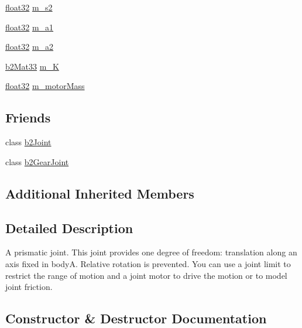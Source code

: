 \begin{DoxyCompactItemize}
\item 
\mbox{\hyperlink{b2_settings_8h_aacdc525d6f7bddb3ae95d5c311bd06a1}{float32}} \mbox{\hyperlink{classb2_prismatic_joint_a7b82750572655292a3e08490d1131f31}{m\+\_\+s2}}
\item 
\mbox{\hyperlink{b2_settings_8h_aacdc525d6f7bddb3ae95d5c311bd06a1}{float32}} \mbox{\hyperlink{classb2_prismatic_joint_afa9f7a7b4317a491d76390e0db7034e4}{m\+\_\+a1}}
\item 
\mbox{\hyperlink{b2_settings_8h_aacdc525d6f7bddb3ae95d5c311bd06a1}{float32}} \mbox{\hyperlink{classb2_prismatic_joint_a91fd8e15cd9c610c343d162cb31e6552}{m\+\_\+a2}}
\item 
\mbox{\hyperlink{structb2_mat33}{b2\+Mat33}} \mbox{\hyperlink{classb2_prismatic_joint_a2a19322c65fd08eda34991dfa50c5d00}{m\+\_\+K}}
\item 
\mbox{\hyperlink{b2_settings_8h_aacdc525d6f7bddb3ae95d5c311bd06a1}{float32}} \mbox{\hyperlink{classb2_prismatic_joint_a6e9fcd93328657df8b7fa1c6c6a517dd}{m\+\_\+motor\+Mass}}
\end{DoxyCompactItemize}
\subsection*{Friends}
\begin{DoxyCompactItemize}
\item 
class \mbox{\hyperlink{classb2_prismatic_joint_a54ade8ed3d794298108d7f4c4e4793fa}{b2\+Joint}}
\item 
class \mbox{\hyperlink{classb2_prismatic_joint_a13c275221e30bb485e17e4e04553cb71}{b2\+Gear\+Joint}}
\end{DoxyCompactItemize}
\subsection*{Additional Inherited Members}


\subsection{Detailed Description}
A prismatic joint. This joint provides one degree of freedom\+: translation along an axis fixed in bodyA. Relative rotation is prevented. You can use a joint limit to restrict the range of motion and a joint motor to drive the motion or to model joint friction. 

\subsection{Constructor \& Destructor Documentation}
\mbox{\label{classb2_prismatic_joint_ab1586a2334f7e32137fbd7f807e249ca}} 
